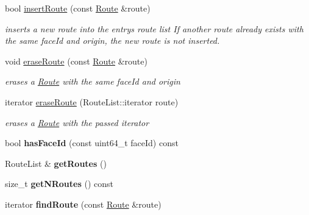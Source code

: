 \begin{DoxyCompactItemize}
\item 
bool \hyperlink{classnfd_1_1rib_1_1RibEntry_a479b1406baa96acda2ea4643b45159b4}{insert\+Route} (const \hyperlink{classnfd_1_1rib_1_1Route}{Route} \&route)
\begin{DoxyCompactList}\small\item\em inserts a new route into the entry\textquotesingle{}s route list If another route already exists with the same face\+Id and origin, the new route is not inserted. \end{DoxyCompactList}\item 
void \hyperlink{classnfd_1_1rib_1_1RibEntry_a6e5849679727e8c47869dd459ff9654b}{erase\+Route} (const \hyperlink{classnfd_1_1rib_1_1Route}{Route} \&route)\hypertarget{classnfd_1_1rib_1_1RibEntry_a6e5849679727e8c47869dd459ff9654b}{}\label{classnfd_1_1rib_1_1RibEntry_a6e5849679727e8c47869dd459ff9654b}

\begin{DoxyCompactList}\small\item\em erases a \hyperlink{classnfd_1_1rib_1_1Route}{Route} with the same face\+Id and origin \end{DoxyCompactList}\item 
iterator \hyperlink{classnfd_1_1rib_1_1RibEntry_ab9a1ea3e7652a45d18ac8c296212c564}{erase\+Route} (Route\+List\+::iterator route)
\begin{DoxyCompactList}\small\item\em erases a \hyperlink{classnfd_1_1rib_1_1Route}{Route} with the passed iterator \end{DoxyCompactList}\item 
bool {\bfseries has\+Face\+Id} (const uint64\+\_\+t face\+Id) const\hypertarget{classnfd_1_1rib_1_1RibEntry_a0ed2140185ebd9b793d7010b94d65c3d}{}\label{classnfd_1_1rib_1_1RibEntry_a0ed2140185ebd9b793d7010b94d65c3d}

\item 
Route\+List \& {\bfseries get\+Routes} ()\hypertarget{classnfd_1_1rib_1_1RibEntry_a2ebf550637e02944919703a628f82b23}{}\label{classnfd_1_1rib_1_1RibEntry_a2ebf550637e02944919703a628f82b23}

\item 
size\+\_\+t {\bfseries get\+N\+Routes} () const\hypertarget{classnfd_1_1rib_1_1RibEntry_a5654d1d822e2f0c71c165bc81e05eca3}{}\label{classnfd_1_1rib_1_1RibEntry_a5654d1d822e2f0c71c165bc81e05eca3}

\item 
iterator {\bfseries find\+Route} (const \hyperlink{classnfd_1_1rib_1_1Route}{Route} \&route)\hypertarget{classnfd_1_1rib_1_1RibEntry_a17454cdf5f55d934c00e833bcfdf301e}{}\label{classnfd_1_1rib_1_1RibEntry_a17454cdf5f55d934c00e833bcfdf301e}


\end{DoxyCompactItemize}
